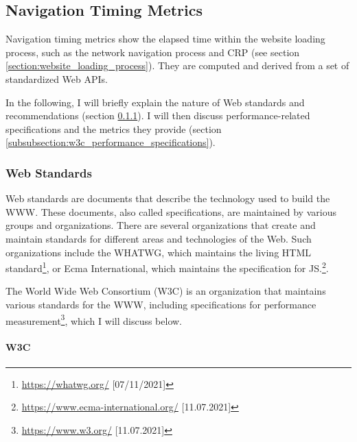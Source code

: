 

\subsection{Navigation Timing Metrics} %
\label{subsection:navigation_timing_metrics}

Navigation timing metrics show the elapsed time within the website loading process, such as the network navigation process and CRP (see section \ref{section:website_loading_process}).
They are computed and derived from a set of standardized Web APIs.

In the following, I will briefly explain the nature of Web standards and recommendations (section \ref{subsubsection:web_standards}).
I will then discuss performance-related specifications and the metrics they provide (section \ref{subsubsection:w3c_performance_specifications}).



\subsubsection{Web Standards} %
\label{subsubsection:web_standards}

Web standards are documents that describe the technology used to build the WWW. %
These documents, also called specifications, are maintained by various groups and organizations.
There are several organizations that create and maintain standards for different areas and technologies of the Web.
Such organizations include the WHATWG, which maintains the living HTML standard\footnote{\url{https://whatwg.org/} [07/11/2021]}, or Ecma International, which maintains the specification for JS.\footnote{\url{https://www.ecma-international.org/} [11.07.2021]}.

The World Wide Web Consortium (W3C) is an organization that maintains various standards for the WWW, including specifications for performance measurement\footnote{\url{https://www.w3.org/} [11.07.2021]}, which I will discuss below.


\paragraph{W3C} %


